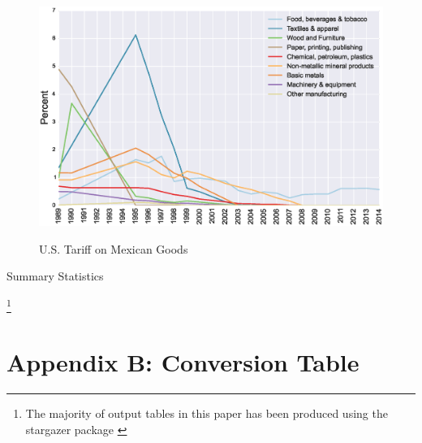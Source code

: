 \begin{figure}[htpb]\centering
\caption{\small U.S. Tariff on Mexican Goods}\vspace{0.2cm}
\includegraphics[scale=0.5]{tau_usa_mex}
\label{fig:usa_mex}
\end{figure}


\begin{center}
\begin{table}

\caption{Summary Statistics}
\label{tab:sumstats}
\end{table}
\end{center}
\footnote{The majority of output tables in this paper has been produced using the stargazer package \citep{Hlavac2014}}

\newpage

\section{Appendix B: Conversion Table}

